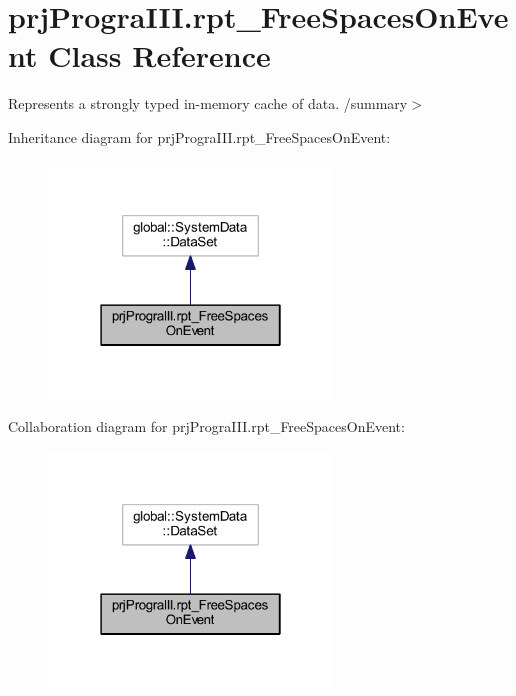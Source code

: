 \hypertarget{classprj_progra_i_i_i_1_1rpt___free_spaces_on_event}{}\section{prj\+Progra\+I\+I\+I.\+rpt\+\_\+\+Free\+Spaces\+On\+Event Class Reference}
\label{classprj_progra_i_i_i_1_1rpt___free_spaces_on_event}


Represents a strongly typed in-\/memory cache of data. /summary$>$  




Inheritance diagram for prj\+Progra\+I\+I\+I.\+rpt\+\_\+\+Free\+Spaces\+On\+Event\+:
\nopagebreak
\begin{figure}[H]
\begin{center}
\leavevmode
\includegraphics[width=214pt]{classprj_progra_i_i_i_1_1rpt___free_spaces_on_event__inherit__graph}
\end{center}
\end{figure}


Collaboration diagram for prj\+Progra\+I\+I\+I.\+rpt\+\_\+\+Free\+Spaces\+On\+Event\+:
\nopagebreak
\begin{figure}[H]
\begin{center}
\leavevmode
\includegraphics[width=214pt]{classprj_progra_i_i_i_1_1rpt___free_spaces_on_event__coll__graph}
\end{center}
\end{figure}
